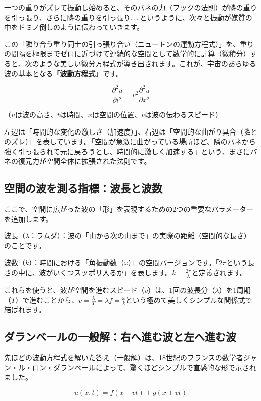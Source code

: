 一つの重りがズレて振動し始めると、そのバネの力（フックの法則）が隣の重りを引っ張り、さらに隣の重りを引っ張り\ldots{}\ldots{}というように、次々と振動が媒質の中をドミノ倒しのように伝わっていきます。

この「隣り合う重り同士の引っ張り合い（ニュートンの運動方程式）」を、重りの間隔を極限までゼロに近づけて連続的な空間として数学的に計算（微積分）すると、次のような美しい微分方程式が導き出されます。これが、宇宙のあらゆる波の基本となる\textbf{「波動方程式」}です。

\[\frac{\partial^2 u}{\partial t^2} = v^2 \frac{\partial^2 u}{\partial x^2}\]

（\(u\)は波の高さ、\(t\)は時間、\(x\)は空間の位置、\(v\)は波の伝わるスピード）

左辺は「時間的な変化の激しさ（加速度）」、右辺は「空間的な曲がり具合（隣とのズレ）」を表しています。「空間が急激に曲がっている場所ほど、隣のバネから強く引っ張られて元に戻ろうとし、時間的に激しく加速する」という、まさにバネの復元力が空間全体に拡張された法則です。

\subsection{空間の波を測る指標：波長と波数}

ここで、空間に広がった波の「形」を表現するための2つの重要なパラメーターを追加します。

波長（\(\lambda\)：ラムダ）：波の「山から次の山まで」の実際の距離（空間的な長さ）のことです。

波数（\(k\)）：時間における「角振動数（\(\omega\)）」の空間バージョンです。「\(2\pi\)という長さの中に、波がいくつスッポリ入るか」を表します。\(k = \frac{2\pi}{\lambda}\)と定義されます。

これらを使うと、波が空間を進むスピード（\(v\)）は、1回の波長分（\(\lambda\)）を1周期（\(T\)）で進むことから、\(v = \frac{\lambda}{T} = \lambda f = \frac{\omega}{k}\)という極めて美しくシンプルな関係式で結ばれます。

\subsection{ダランベールの一般解：右へ進む波と左へ進む波}

先ほどの波動方程式を解いた答え（一般解）は、18世紀のフランスの数学者ジャン・ル・ロン・ダランベールによって、驚くほどシンプルで直感的な形で示されました。

\[u(x,t) = f(x - vt) + g(x + vt)\]

